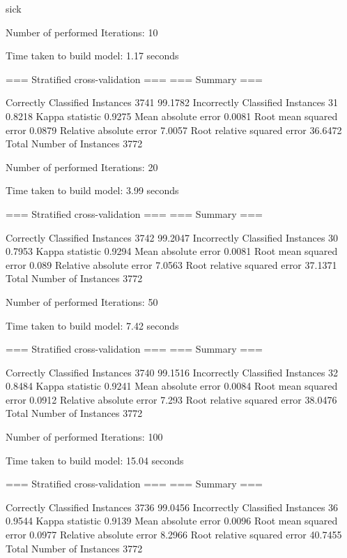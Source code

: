 sick 

Number of performed Iterations: 10


Time taken to build model: 1.17 seconds

=== Stratified cross-validation ===
=== Summary ===

Correctly Classified Instances        3741               99.1782 %
Incorrectly Classified Instances        31                0.8218 %
Kappa statistic                          0.9275
Mean absolute error                      0.0081
Root mean squared error                  0.0879
Relative absolute error                  7.0057 %
Root relative squared error             36.6472 %
Total Number of Instances             3772

Number of performed Iterations: 20


Time taken to build model: 3.99 seconds

=== Stratified cross-validation ===
=== Summary ===

Correctly Classified Instances        3742               99.2047 %
Incorrectly Classified Instances        30                0.7953 %
Kappa statistic                          0.9294
Mean absolute error                      0.0081
Root mean squared error                  0.089 
Relative absolute error                  7.0563 %
Root relative squared error             37.1371 %
Total Number of Instances             3772

Number of performed Iterations: 50


Time taken to build model: 7.42 seconds

=== Stratified cross-validation ===
=== Summary ===

Correctly Classified Instances        3740               99.1516 %
Incorrectly Classified Instances        32                0.8484 %
Kappa statistic                          0.9241
Mean absolute error                      0.0084
Root mean squared error                  0.0912
Relative absolute error                  7.293  %
Root relative squared error             38.0476 %
Total Number of Instances             3772

Number of performed Iterations: 100


Time taken to build model: 15.04 seconds

=== Stratified cross-validation ===
=== Summary ===

Correctly Classified Instances        3736               99.0456 %
Incorrectly Classified Instances        36                0.9544 %
Kappa statistic                          0.9139
Mean absolute error                      0.0096
Root mean squared error                  0.0977
Relative absolute error                  8.2966 %
Root relative squared error             40.7455 %
Total Number of Instances             3772


